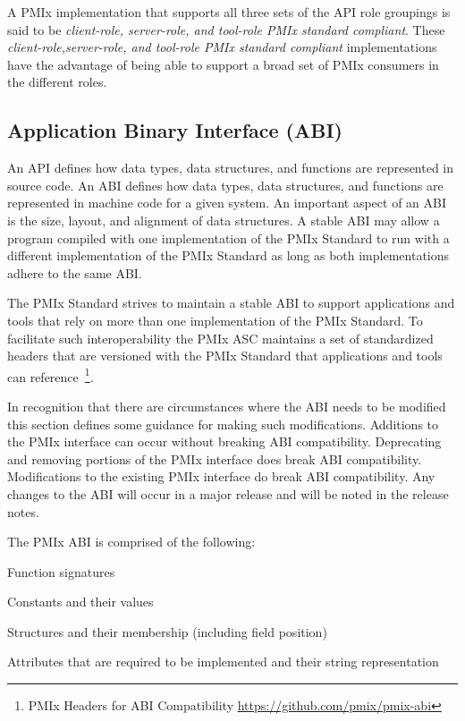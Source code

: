 A \ac{PMIx} implementation that supports all three sets of the \ac{API} role groupings is said to be \emph{client-role, server-role, and tool-role \ac{PMIx} standard compliant}.
These \emph{client-role,server-role, and tool-role \ac{PMIx} standard compliant} implementations have the advantage of being able to support a broad set of \ac{PMIx} consumers in the different roles.
\adviceimplend

\subsection{Application Binary Interface (ABI)}

An \acf{API} defines how data types, data structures, and functions are represented in source code.
An \acf{ABI} defines how data types, data structures, and functions are represented in machine code for a given system.
An important aspect of an \ac{ABI} is the size, layout, and alignment of data structures.
A stable \ac{ABI} may allow a program compiled with one implementation of the PMIx Standard to run with a different implementation of the PMIx Standard as long as both implementations adhere to the same \ac{ABI}.

The PMIx Standard strives to maintain a stable \ac{ABI} to support applications and tools that rely on more than one implementation of the PMIx Standard.
To facilitate such interoperability the PMIx \ac{ASC} maintains a set of standardized headers that are versioned with the PMIx Standard that applications and tools can reference~\footnote{PMIx Headers for ABI Compatibility \url{https://github.com/pmix/pmix-abi}}.

In recognition that there are circumstances where the \ac{ABI} needs to be modified this section defines some guidance for making such modifications.
Additions to the PMIx interface can occur without breaking \ac{ABI} compatibility.
Deprecating and removing portions of the PMIx interface does break \ac{ABI} compatibility.
Modifications to the existing PMIx interface do break \ac{ABI} compatibility.
Any changes to the \ac{ABI} will occur in a major release and will be noted in the release notes.

The PMIx \ac{ABI} is comprised of the following:
\begin{compactalphaenum}
\item Function signatures
\item Constants and their values
\item Structures and their membership (including field position)
\item Attributes that are required to be implemented and their string representation
\end{compactalphaenum}

